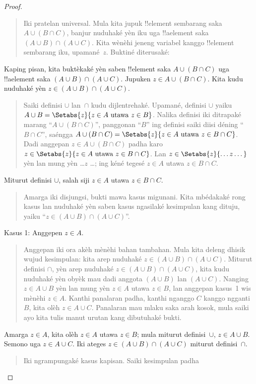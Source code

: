 \documentclass[../../../include/open-logic-section]{subfiles}
\begin{document}
\begin{proof}
\begin{quote}
Iki pratelan universal. Mula kita jupuk !!{element} sembarang
saka $A \cup (B \cap C)$, banjur nuduhaké yèn iku uga
!!a{element} saka $(A \cup B) \cap (A \cup C)$.
Kita wènèhi jeneng variabel kanggo !!{element} sembarang
iku, upamané~$z$. Buktiné diterusaké:
\end{quote}
Kaping pisan, kita buktèkaké yèn saben !!{element} saka
$A \cup (B \cap C)$ uga !!a{element} saka $(A \cup B)
\cap (A \cup C)$. Jupuken $z \in A \cup (B
\cap C)$. Kita kudu nuduhaké yèn
$z \in (A \cup B) \cap (A \cup C)$.
\begin{quote}
Saiki definisi $\cup$ lan~$\cap$ kudu dijlentrehaké.
Upamané, definisi $\cup$ yaiku
$A \cup B = \Setabs{z}{z \in A
  \text{ utawa } z \in B}$. Nalika definisi iki ditrapaké
marang ``$A \cup (B
\cap C)$'', panggonan ``$B$'' ing definisi
saiki diisi déning ``$B \cap C$'', saéngga
$A \cup (B \cap C) = \Setabs{z}{z \in A \text{ utawa }
  z \in B \cap C}$. Dadi anggepan
$z \in A \cup (B \cap C)$ padha karo
$z \in \Setabs{z}{z \in A \text{ utawa } z \in B \cap
  C}$. Lan $z \in \Setabs{z}{\dots z\dots}$ yèn lan mung yèn
\dots $z$ \dots; ing kéné tegesé $z \in A$ utawa $z \in B \cap C$.
\end{quote}
Miturut definisi $\cup$, salah siji $z \in A$ utawa
$z \in B \cap C$.
\begin{quote}
Amarga iki disjungsi, bukti mawa kasus migunani. Kita
mbédakaké rong kasus lan nuduhaké yèn saben kasus ngasilaké
kesimpulan kang dituju, yaiku ``$z \in (A \cup B) \cap (A \cup
C)$''.
\end{quote}
Kasus 1: Anggepen $z \in A$.
\begin{quote}
Anggepan iki ora akèh mènèhi bahan tambahan. Mula kita deleng
dhisik wujud kesimpulan: kita arep nuduhaké
$z \in (A \cup B) \cap (A \cup C)$. Miturut definisi
$\cap$, yèn arep nuduhaké $z \in (A \cup B) \cap (A \cup C)$,
kita kudu nuduhaké yèn obyèk mau dadi anggota $(A \cup B)$
lan $(A \cup C)$. Nanging $z
\in A \cup B$ yèn lan mung yèn $z \in A$ utawa $z \in B$,
lan anggepan kasus~1 wis mènèhi $z \in A$.
Kanthi panalaran padha, kanthi nganggo $C$ kanggo ngganti $B$,
kita olèh $z \in A \cup C$.
Panalaran mau mlaku saka arah kosok, mula saiki ayo
kita tulis manut urutan kang dibutuhaké bukti.
\end{quote}
Amarga $z \in A$, kita olèh $z \in A$ utawa $z \in B$;
mula miturut definisi~$\cup$, $z \in A \cup B$.
Semono uga $z \in A \cup C$. Iki ateges
$z \in (A \cup B) \cap (A \cup C)$ miturut definisi~$\cap$.
\begin{quote}
Iki ngrampungaké kasus kapisan. Saiki kesimpulan padha

\end{quote}
\end{proof}
\end{document}
